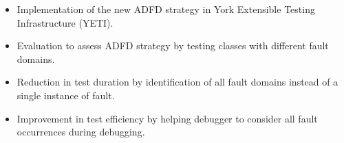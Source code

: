 \begin{itemize}
\item Implementation of the new ADFD strategy in York Extensible Testing Infrastructure (YETI).
\item Evaluation to assess ADFD strategy by testing classes with different fault domains.
\item Reduction in test duration by identification of all fault domains instead of a single instance of fault.
\item Improvement in test efficiency by helping debugger to consider all fault occurrences during debugging. 
\end{itemize}







